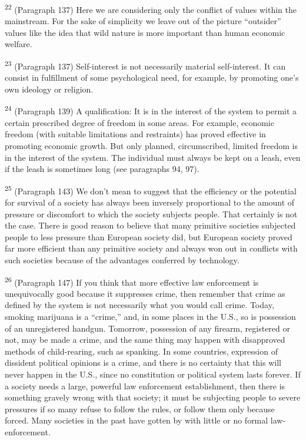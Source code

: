 \documentclass{article}
\begin{document}
\textsuperscript{22} (Paragraph 137) Here we are considering only the conflict of values within the 
mainstream. For the sake of simplicity we leave out of the picture “outsider” values like the idea 
that wild nature is more important than human economic welfare. \vspace{\baselineskip}

\textsuperscript{23} (Paragraph 137) Self-interest is not necessarily material self-interest. It can consist in fulfillment 
of some psychological need, for example, by promoting one’s own ideology or religion. \vspace{\baselineskip}

\textsuperscript{24} (Paragraph 139) A qualification: It is in the interest of the system to permit a certain prescribed 
degree of freedom in some areas. For example, economic freedom (with suitable limitations and 
restraints) has proved effective in promoting economic growth. But only planned, 
circumscribed, limited freedom is in the interest of the system. The individual must always be 
kept on a leash, even if the leash is sometimes long (see paragraphs 94, 97). \vspace{\baselineskip}

\textsuperscript{25} (Paragraph 143) We don’t mean to suggest that the efficiency or the potential for survival of a 
society has always been inversely proportional to the amount of pressure or discomfort to which 
the society subjects people. That certainly is not the case. There is good reason to believe that 
many primitive societies subjected people to less pressure than European society did, but European 
society proved far more efficient than any primitive society and always won out in conflicts with 
such societies because of the advantages conferred by technology. \vspace{\baselineskip}

\textsuperscript{26} (Paragraph 147) If you think that more effective law enforcement is unequivocally good 
because it suppresses crime, then remember that crime as defined by the system is not 
necessarily what you would call crime. Today, smoking marijuana is a “crime,” and, in some 
places in the U.S., so is possession of an unregistered handgun. Tomorrow, possession of any 
firearm, registered or not, may be made a crime, and the same thing may happen with 
disapproved methods of child-rearing, such as spanking. In some countries, expression of 
dissident political opinions is a crime, and there is no certainty that this will never happen in the 
U.S., since no constitution or political system lasts forever. If a society needs a large, powerful 
law enforcement establishment, then there is something gravely wrong with that society; it must 
be subjecting people to severe pressures if so many refuse to follow the rules, or follow them 
only because forced. Many societies in the past have gotten by with little or no formal law-
enforcement. \vspace{\baselineskip}
\end{document}
